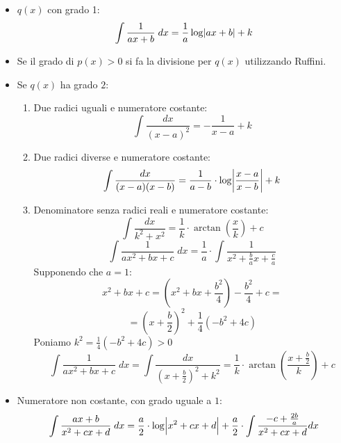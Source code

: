 \documentclass{article}
\begin{document}
\begin{itemize}
    \item $q(x)$ con grado 1:
        \begin{equation*}
            \int \frac{1}{ax + b} \; dx = \frac{1}{a} \log{\abs{ax + b}} + k
        \end{equation*}
    \item Se il grado di $p(x) > 0$ si fa la divisione per $q(x)$ utilizzando Ruffini.
    \item Se $q(x)$ ha grado $2$:
        \begin{enumerate}
            \item Due radici uguali e numeratore costante:
            \begin{equation*}
                \int \frac{dx}{(x - a)^2} = -\frac{1}{x - a} + k
            \end{equation*}
            \item Due radici diverse e numeratore costante:
            \begin{equation*}
                \int \frac{dx}{(x - a)(x - b)} = \frac{1}{a - b} \cdot \log{\abs{\frac{x - a}{x - b}}} + k
            \end{equation*}
            \item Denominatore senza radici reali e numeratore costante:
                \begin{equation*}
                    \int \frac{dx}{k^2 + x^2} = \frac{1}{k} \cdot \arctan(\frac{x}{k}) + c
                \end{equation*}
                \begin{equation*}
                    \int \frac{1}{ax^2 + bx + c} \; dx = \frac{1}{a} \cdot \int \frac{1}{x^2 + \frac{b}{a}x + \frac{c}{a}}
                \end{equation*}
                Supponendo che $a = 1$:
                \begin{equation*}
                    x^2 + bx + c = (x^2 + bx + \frac{b^2}{4}) - \frac{b^2}{4} + c =
                \end{equation*}
                \begin{equation*}
                    = (x + \frac{b}{2})^2 + \frac{1}{4}(-b^2 + 4c)
                \end{equation*}
                Poniamo $k^2 = \frac{1}{4}(-b^2 + 4c) > 0$
                \begin{equation*}
                    \int \frac{1}{ax^2 + bx + c} \; dx = \int \frac{dx}{(x + \frac{b}{2})^2 + k^2} = \frac{1}{k} \cdot \arctan(\frac{x + \frac{b}{2}}{k}) + c
                \end{equation*}
        \end{enumerate}
    \item Numeratore non costante, con grado uguale a $1$:
        \begin{equation*}
            \int \frac{ax + b}{x^2 + cx + d} \; dx = \frac{a}{2} \cdot \log{\abs{x^2 + cx + d}} + \frac{a}{2} \cdot \int{\frac{-c + \frac{2b}{a}}{x^2 + cx + d}} dx
        \end{equation*}
\end{itemize}
\end{document}
